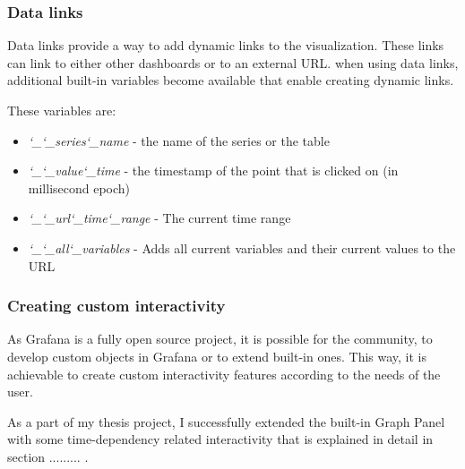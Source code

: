 \subsubsection{Data links}

Data links provide a way to add dynamic links to the visualization. These links can link to either other dashboards or to an external URL. when using data links, additional built-in variables become available that enable creating dynamic links.

These variables are:
\begin{itemize}
	\item \emph{\char`_\char`_series\char`_name} - the name of the series or the table
	\item \emph{\char`_\char`_value\char`_time} - the timestamp of the point that is clicked on (in millisecond epoch)
	\item \emph{\char`_\char`_url\char`_time\char`_range} - The current time range
	\item \emph{\char`_\char`_all\char`_variables} - Adds all current variables and their current values to the URL
\end{itemize}

\subsubsection{Creating custom interactivity}

As Grafana is a fully open source project, it is possible for the community, to develop custom objects in Grafana or to extend built-in ones. This way, it is achievable to create custom interactivity features according to the needs of the user.

As a part of my thesis project, I successfully extended the built-in Graph Panel with some time-dependency related interactivity that is explained in detail in section ......... .



